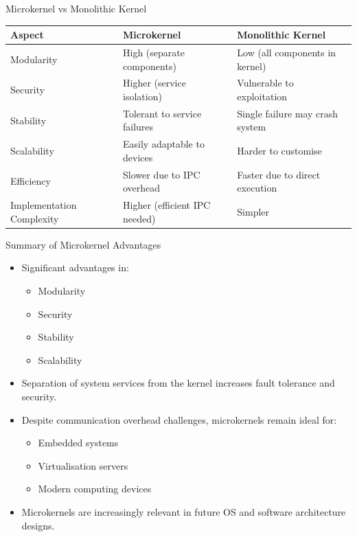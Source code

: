 \documentclass[aspectratio=169, table]{beamer}
\begin{document}
\begin{frame}{Microkernel vs Monolithic Kernel}
\vspace{20pt}
\begin{table}[h]
\centering
\renewcommand{\arraystretch}{1.3}
\setlength{\arrayrulewidth}{0.8pt} %
\begin{tabular}{|p{}|p{}|p{}|}
	\hline
	\textbf{Aspect} & \textbf{Microkernel} & \textbf{Monolithic Kernel} \\
	\hline
	Modularity & High (separate components) & Low (all components in kernel) \\
	Security & Higher (service isolation) & Vulnerable to exploitation \\
	Stability & Tolerant to service failures & Single failure may crash system \\
	Scalability & Easily adaptable to devices & Harder to customise \\
	Efficiency & Slower due to IPC overhead & Faster due to direct execution \\
	Implementation Complexity & Higher (efficient IPC needed) & Simpler \\
	\hline
\end{tabular}
\label{tab:microkernel_vs_monolithic}
\end{table}
\end{frame}

\begin{frame}{Summary of Microkernel Advantages}
\vspace{20pt}
\begin{itemize}
\item Significant advantages in:
\begin{itemize}
	\item Modularity
	\item Security
	\item Stability
	\item Scalability
\end{itemize}
\item Separation of system services from the kernel increases fault tolerance and security.
\item Despite communication overhead challenges, microkernels remain ideal for:
\begin{itemize}
	\item Embedded systems
	\item Virtualisation servers
	\item Modern computing devices
\end{itemize}
\item Microkernels are increasingly relevant in future OS and software architecture designs.
\end{itemize}
\end{frame}
\end{document}
